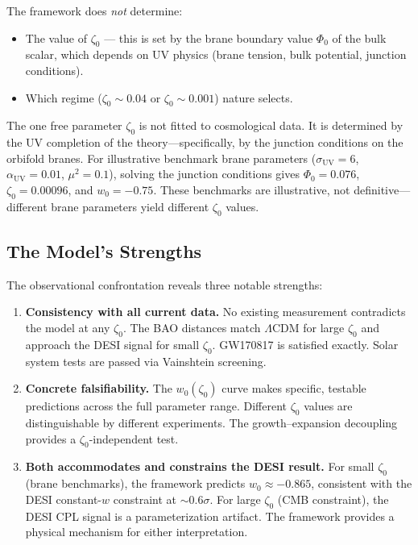 The framework does \emph{not} determine:
\begin{itemize}
    \item The value of $\zeta_0$ --- this is set by the brane boundary value $\Phi_0$ of the bulk scalar, which depends on UV physics (brane tension, bulk potential, junction conditions).
    \item Which regime ($\zeta_0 \sim 0.04$ or $\zeta_0 \sim 0.001$) nature selects.
\end{itemize}

The one free parameter $\zeta_0$ is not fitted to cosmological data. It is determined by the UV completion of the theory---specifically, by the junction conditions on the orbifold branes. For illustrative benchmark brane parameters ($\sigma_\mathrm{UV} = 6$, $\alpha_\mathrm{UV} = 0.01$, $\mu^2 = 0.1$), solving the junction conditions gives $\Phi_0 = 0.076$, $\zeta_0 = 0.00096$, and $w_0 = -0.75$. These benchmarks are illustrative, not definitive---different brane parameters yield different $\zeta_0$ values.

\subsection{The Model's Strengths}
\label{sec:2-strengths}

The observational confrontation reveals three notable strengths:
\begin{enumerate}
    \item \textbf{Consistency with all current data.} No existing measurement contradicts the model at any $\zeta_0$. The BAO distances match $\Lambda$CDM for large $\zeta_0$ and approach the DESI signal for small $\zeta_0$. GW170817 is satisfied exactly. Solar system tests are passed via Vainshtein screening.

    \item \textbf{Concrete falsifiability.} The $w_0(\zeta_0)$ curve makes specific, testable predictions across the full parameter range. Different $\zeta_0$ values are distinguishable by different experiments. The growth--expansion decoupling provides a $\zeta_0$-independent test.

    \item \textbf{Both accommodates and constrains the DESI result.} For small $\zeta_0$ (brane benchmarks), the framework predicts $w_0 \approx -0.865$, consistent with the DESI constant-$w$ constraint at ${\sim}0.6\sigma$. For large $\zeta_0$ (CMB constraint), the DESI CPL signal is a parameterization artifact. The framework provides a physical mechanism for either interpretation.
\end{enumerate}

